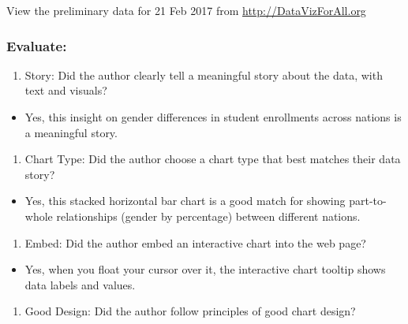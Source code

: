 \documentclass[
  english,
]{book}
\providecommand{\tightlist}{%
  \setlength{\itemsep}{0pt}\setlength{\parskip}{0pt}}
\begin{document}
View the preliminary data for 21 Feb 2017 from \url{http://DataVizForAll.org}

\hypertarget{evaluate-3}{%
\subsubsection{Evaluate:}\label{evaluate-3}}

\begin{enumerate}
\def\labelenumi{\arabic{enumi}.}
\tightlist
\item
  Story: Did the author clearly tell a meaningful story about the data, with text and visuals?
\end{enumerate}

\begin{itemize}
\tightlist
\item
  Yes, this insight on gender differences in student enrollments across nations is a meaningful story.
\end{itemize}

\begin{enumerate}
\def\labelenumi{\arabic{enumi}.}
\setcounter{enumi}{1}
\tightlist
\item
  Chart Type: Did the author choose a chart type that best matches their data story?
\end{enumerate}

\begin{itemize}
\tightlist
\item
  Yes, this stacked horizontal bar chart is a good match for showing part-to-whole relationships (gender by percentage) between different nations.
\end{itemize}

\begin{enumerate}
\def\labelenumi{\arabic{enumi}.}
\setcounter{enumi}{2}
\tightlist
\item
  Embed: Did the author embed an interactive chart into the web page?
\end{enumerate}

\begin{itemize}
\tightlist
\item
  Yes, when you float your cursor over it, the interactive chart tooltip shows data labels and values.
\end{itemize}

\begin{enumerate}
\def\labelenumi{\arabic{enumi}.}
\setcounter{enumi}{3}
\tightlist
\item
  Good Design: Did the author follow principles of good chart design?
\end{enumerate}
\end{document}
